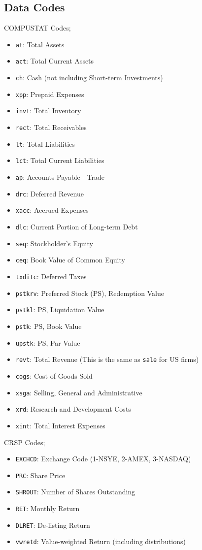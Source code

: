 
\subsection{Data Codes} \label{sec:datacodes}

COMPUSTAT Codes;
\begin{itemize}
  \item \texttt{at}: Total Assets
  \item \texttt{act}: Total Current Assets
  \item \texttt{ch}: Cash (not including Short-term Investments)
  \item \texttt{xpp}: Prepaid Expenses
  \item \texttt{invt}: Total Inventory
  \item \texttt{rect}: Total Receivables
  \item \texttt{lt}: Total Liabilities
  \item \texttt{lct}: Total Current Liabilities
  \item \texttt{ap}: Accounts Payable - Trade
  \item \texttt{drc}: Deferred Revenue
  \item \texttt{xacc}: Accrued Expenses
  \item \texttt{dlc}: Current Portion of Long-term Debt
  \item \texttt{seq}: Stockholder's Equity
  \item \texttt{ceq}: Book Value of Common Equity
  \item \texttt{txditc}: Deferred Taxes
  \item \texttt{pstkrv}: Preferred Stock (PS), Redemption Value
  \item \texttt{pstkl}: PS, Liquidation Value
  \item \texttt{pstk}: PS, Book Value
  \item \texttt{upstk}: PS, Par Value
  \item \texttt{revt}: Total Revenue (This is the same as \texttt{sale} for US firms)
  \item \texttt{cogs}: Cost of Goods Sold
  \item \texttt{xsga}: Selling, General and Administrative
  \item \texttt{xrd}: Research and Development Costs
  \item \texttt{xint}: Total Interest Expenses
\end{itemize}

CRSP Codes;
\begin{itemize}
  \item \texttt{EXCHCD}: Exchange Code (1-NSYE, 2-AMEX, 3-NASDAQ)
  \item \texttt{PRC}: Share Price
  \item \texttt{SHROUT}: Number of Shares Outstanding
  \item \texttt{RET}: Monthly Return
  \item \texttt{DLRET}: De-listing Return
  \item \texttt{vwretd}: Value-weighted Return (including distributions)
\end{itemize}
